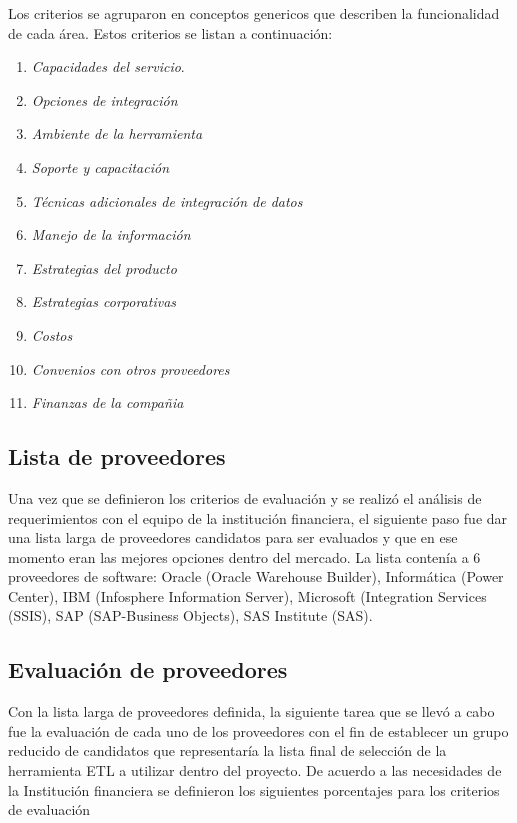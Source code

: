 \documentclass[a4paper,openright,12pt]{book}
\begin{document}
Los criterios se agruparon en conceptos genericos que describen la funcionalidad de cada área. Estos criterios se listan a continuación:

\begin{enumerate}
\item \textit{Capacidades del servicio}.
\item \textit{Opciones de integración}
\item \textit{Ambiente de la herramienta}
\item \textit{Soporte y capacitación}
\item \textit{Técnicas adicionales de integración de datos}
\item \textit{Manejo de la información}
\item \textit{Estrategias del producto}
\item \textit{Estrategias corporativas}
\item \textit{Costos}
\item \textit{Convenios con otros proveedores}
\item \textit{Finanzas de la compañia}
\end{enumerate} 

\subsection{Lista de proveedores}
Una vez que se definieron los criterios de evaluación y se realizó el análisis de requerimientos con el equipo de la institución financiera, el siguiente paso fue dar una lista larga de proveedores candidatos para ser evaluados y que en ese momento eran las mejores opciones dentro del mercado. La lista contenía a 6 proveedores de software: Oracle (Oracle Warehouse Builder), Informática (Power Center), IBM (Infosphere Information Server), Microsoft (Integration Services (SSIS), SAP (SAP-Business Objects), SAS Institute (SAS).


\subsection{Evaluación de proveedores} 
Con la lista larga de proveedores definida, la siguiente tarea que se llevó a cabo fue la evaluación de cada uno de los proveedores con el fin de establecer un grupo reducido de candidatos que representaría la lista final de selección de la herramienta ETL a utilizar dentro del proyecto. De acuerdo a las necesidades de la Institución financiera se definieron los siguientes porcentajes para los criterios de evaluación
\end{document}
